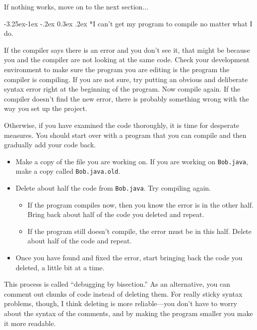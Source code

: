 \documentclass{book}
\makeatletter
\renewcommand\subsection{\@startsection {subsection}{2}{0mm}%
    {-3.25ex\@plus -1ex \@minus -.2ex}%
    {0.3ex \@plus .2ex}%
    {\normalfont\large\bfseries}}
\makeatother
\begin{document}
If nothing works, move on to the next section...


\subsection*{I can't get my program to compile no matter
what I do.}

If the compiler says there is an error and you don't see it, that
might be because you and the compiler are not looking at the same
code.  Check your development environment to make sure the program
you are editing is the program the compiler is compiling.  If you
are not sure, try putting an obvious and deliberate syntax error
right at the beginning of the program.  Now compile again.  If
the compiler doesn't find the new error, there is probably something
wrong with the way you set up the project.

Otherwise, if you have examined the code thoroughly,
it is time for desperate measures.  You should start over with
a program that you can compile and then gradually add your code
back.

\begin{itemize}

\item Make a copy of the file you are working on.  If you are
working on {\tt Bob.java}, make a copy called {\tt Bob.java.old}.

\item Delete about half the code from {\tt Bob.java}.  Try compiling
again.

\begin{itemize}

\item If the program compiles now, then you know the error is in
the other half.  Bring back about half of the code you deleted and
repeat.

\item If the program still doesn't compile, the error must be in
this half.  Delete about half of the code and repeat.

\end{itemize}

\item Once you have found and fixed the error, start bringing back
the code you deleted, a little bit at a time.

\end{itemize}

This process is called ``debugging by bisection.''  As an
alternative, you can comment out chunks of code instead of
deleting them.  For really sticky syntax problems, though,
I think deleting is more reliable---you don't have to worry
about the syntax of the comments, and by making the program
smaller you make it more readable.
\end{document}
